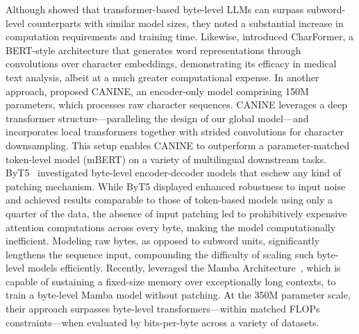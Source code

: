 Although \cite{Choe2019BridgingTG} showed that transformer-based byte-level LLMs can surpass subword-level counterparts with similar model sizes, they noted a substantial increase in computation requirements and training time. Likewise, \cite{el2020characterbert} introduced CharFormer, a BERT-style architecture that generates word representations through convolutions over character embeddings, demonstrating its efficacy in medical text analysis, albeit at a much greater computational expense. In another approach, \cite{clark2022canine} proposed CANINE, an encoder-only model comprising 150M parameters, which processes raw character sequences. CANINE leverages a deep transformer structure—paralleling the design of our global model—and incorporates local transformers together with strided convolutions for character downsampling. This setup enables CANINE to outperform a parameter-matched token-level model (mBERT) on a variety of multilingual downstream tasks. ByT5~\citep{xue2022byt5} investigated byte-level encoder-decoder models that eschew any kind of patching mechanism. While ByT5 displayed enhanced robustness to input noise and achieved results comparable to those of token-based models using only a quarter of the data, the absence of input patching led to prohibitively expensive attention computations across every byte, making the model computationally inefficient. Modeling raw bytes, as opposed to subword units, significantly lengthens the sequence input, compounding the difficulty of scaling such byte-level models efficiently. Recently, \cite{wang2024mambabyte} leveraged the Mamba Architecture~\citep{gu2023mamba}, which is capable of sustaining a fixed-size memory over exceptionally long contexts, to train a byte-level Mamba model without patching. At the 350M parameter scale, their approach surpasses byte-level transformers—within matched FLOPs constraints—when evaluated by bits-per-byte across a variety of datasets.

